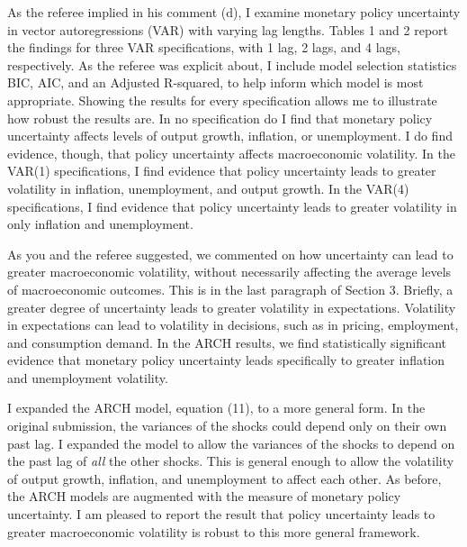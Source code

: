 \documentclass[12pt]{article}
\begin{document}
\item As the referee implied in his comment (d), I examine monetary policy uncertainty in vector autoregressions (VAR) with varying lag lengths.  Tables 1 and 2 report the findings for three VAR specifications, with 1 lag, 2 lags, and 4 lags, respectively.  As the referee was explicit about, I include model selection statistics BIC, AIC, and an Adjusted R-squared, to help inform which model is most appropriate.  Showing the results for every specification allows me to illustrate how robust the results are.  In no specification do I find that monetary policy uncertainty affects levels of output growth, inflation, or unemployment.  I do find evidence, though, that policy uncertainty affects macroeconomic volatility.  In the VAR(1) specifications, I find evidence that policy uncertainty leads to greater volatility in inflation, unemployment, and output growth.  In the VAR(4) specifications, I find evidence that policy uncertainty leads to greater volatility in only inflation and unemployment.  

\item As you and the referee suggested, we commented on how uncertainty can lead to greater macroeconomic volatility, without necessarily affecting the average levels of macroeconomic outcomes.  This is in the last paragraph of Section 3.  Briefly, a greater degree of uncertainty leads to greater volatility in expectations.  Volatility in expectations can lead to volatility in decisions, such as in pricing, employment, and consumption demand.  In the ARCH results, we find statistically significant evidence that monetary policy uncertainty leads specifically to greater inflation and unemployment volatility.

\item I expanded the ARCH model, equation (11), to a more general form.  In the original submission, the variances of the shocks could depend only on their own past lag.  I expanded the model to allow the variances of the shocks to depend on the past lag of \textit{all} the other shocks.  This is general enough to allow the volatility of output growth, inflation, and unemployment to affect each other.  As before, the ARCH models are augmented with the measure of monetary policy uncertainty.  I am pleased to report the result that policy uncertainty leads to greater macroeconomic volatility is robust to this more general framework.
\end{document}
